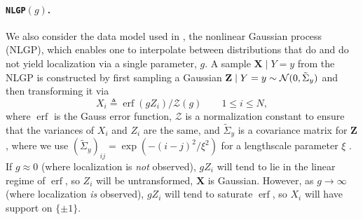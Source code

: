 

\paragraph{\texttt{NLGP}$(g)$.}\hspace{-2pt}
We also consider the data model used in \textcite{ingrosso2022data}, the nonlinear Gaussian process (NLGP), which enables one to interpolate between distributions that do and do not yield localization via a single parameter, $g$.
A sample $\mathbf{X} \mid Y = y$ from the NLGP is constructed by first sampling a Gaussian $\mathbf{Z} \mid Y = y \sim \operatorname{\mathcal{N}}(0, \tilde{\Sigma}_y)$ and then transforming it via
\begin{equation} \label{eq:nlgp}
    X_i \triangleq \operatorname{erf}(g Z_i) / \mathcal{Z}(g) \qquad 1 \leq i \leq N,
\end{equation}
where $\operatorname{erf}$ is the Gauss error function, $\mathcal{Z}$ is a normalization constant to ensure that the variances of $X_i$ and $Z_i$ are the same, and $\tilde{\Sigma}_y$ is a covariance matrix for $\mathbf{Z}$, where we use $(\tilde{\Sigma}_y)_{ij} = \exp(-(i-j)^2/\xi^2)$ for a lengthscale parameter $\xi$ \cite{ingrosso2022data}. 
If $g \approx 0$ (where localization is \emph{not} observed), $g Z_i$ will tend to lie in the linear regime of $\operatorname{erf}$, so $Z_i$ will be untransformed, \ie $\mathbf{X}$ is Gaussian.
However, as $g \to \infty$ (where localization \emph{is} observed), $g Z_i$ will tend to saturate $\operatorname{erf}$, so $X_i$ will have support on $\{ \pm 1 \}$.

